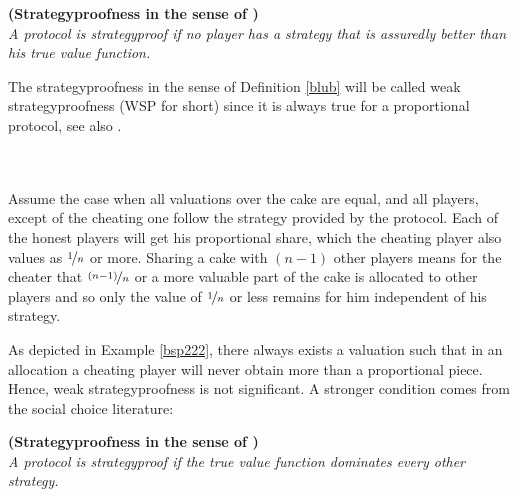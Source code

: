 \begin{defi}{\textbf{(Strategyproofness in the sense of \cite{pie})}}\\
\label{blub}
\emph{A protocol is \emph{strategyproof} if no player has a strategy that is assuredly better than his true value function.}
\end{defi}
The strategyproofness in the sense of Definition \ref{blub} will be called weak strategyproofness (WSP for short) since it is always true for a proportional protocol, see also \cite{ccc}.
\begin{bsp}
\label{bsp222}
\textcolor{white}{x}\\\\
Assume the case when all valuations over the cake are equal, and all players, except of the cheating one follow the strategy provided by the protocol. Each of the honest players will get his proportional share, which the cheating player also values as $\nicefrac{1}{n}$ or more. Sharing a cake with $(n-1)$ other players means for the cheater that $\nicefrac{(n-1)}{n}$ or a more valuable part of the cake is allocated to other players and so only the value of $\nicefrac{1}{n}$ or less remains for him independent of his strategy. 
\end{bsp}
%
%
As depicted in Example \ref{bsp222}, there always exists a valuation such that in an allocation a cheating player will never obtain more than a proportional piece. Hence, weak strategyproofness is not significant.
\newline
A stronger condition comes from the social choice literature:

\begin{defi}{\textbf{(Strategyproofness in the sense of \cite{why})}}\\
\label{laberlaberlaber}
\emph{A protocol is \emph{strategyproof} if the true value function dominates every other strategy.}
\end{defi}

